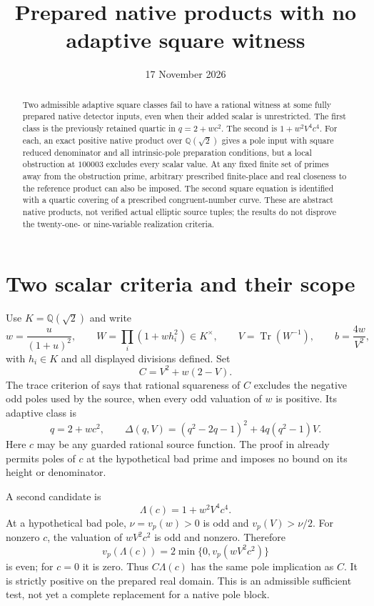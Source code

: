 \documentclass[11pt,a4paper]{article}
\title{Prepared native products with no adaptive square witness}
\author{}\date{17 November 2026}
\newcommand{\Q}{\mathbb Q}\newcommand{\Z}{\mathbb Z}
\newcommand{\Tr}{\operatorname{Tr}}\newcommand{\Nm}{\operatorname{N}}
\begin{document}
\maketitle
\begin{abstract}
Two admissible adaptive square classes fail to have a rational
witness at some fully prepared native detector inputs, even when
their added scalar is unrestricted. The first class is the previously
retained quartic in $q=2+wc^2$. The second is $1+w^2V^4c^4$.
For each, an exact positive native product over $\Q(\sqrt2)$ gives
a pole input with square reduced denominator and all intrinsic-pole
preparation conditions, but a local obstruction at $100003$ excludes
every scalar value. At any fixed finite set of primes away from
the obstruction prime, arbitrary prescribed finite-place and real
closeness to the reference product can also be imposed. The second
square equation is identified with a quartic covering of a prescribed
congruent-number curve. These are abstract native products, not
verified actual elliptic source tuples; the results do not disprove
the twenty-one- or nine-variable realization criteria.
\end{abstract}

\section{Two scalar criteria and their scope}

Use $K=\Q(\sqrt2)$ and write
\[
 w=\frac{u}{(1+u)^2},\qquad
 W=\prod_i(1+wh_i^2)\in K^\times,\qquad
 V=\Tr(W^{-1}),\qquad b=\frac{4w}{V^2},
\]
with $h_i\in K$ and all displayed divisions defined. Set
\[
                         C=V^2+w(2-V).
\]
The trace criterion of \cite{Trace} says that rational squareness
of $C$ excludes the negative odd poles used by the source, when
every odd valuation of $w$ is positive. Its adaptive class is
\begin{equation}\label{eq:first}
 q=2+wc^2,\qquad
 \Delta(q,V)=(q^2-2q-1)^2+4q(q^2-1)V.
\end{equation}
Here $c$ may be any guarded rational source function. The proof in
\cite{Trace} already permits poles of $c$ at the hypothetical bad
prime and imposes no bound on its height or denominator.

A second candidate is
\begin{equation}\label{eq:second}
                         \Lambda(c)=1+w^2V^4c^4.
\end{equation}
At a hypothetical bad pole, $\nu=v_p(w)>0$ is odd and
$v_p(V)>\nu/2$. For nonzero $c$, the valuation of $wV^2c^2$
is odd and nonzero. Therefore
\[
 v_p(\Lambda(c))=2\min\{0,v_p(wV^2c^2)\}
\]
is even; for $c=0$ it is zero. Thus $C\Lambda(c)$ has the same
pole implication as $C$. It is strictly positive on the prepared
real domain. This is an admissible sufficient test, not yet a
complete replacement for a native pole block.
\end{document}
